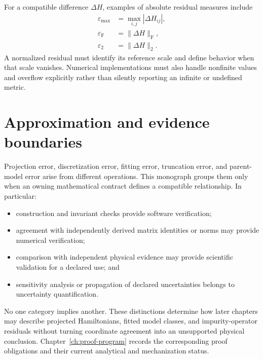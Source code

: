 For a compatible difference $\Delta H$, examples of absolute residual measures
include
\begin{align}
  \varepsilon_{\max} &= \max_{i,j}|\Delta H_{ij}|,\\
  \varepsilon_{\mathrm F} &= \|\Delta H\|_{\mathrm F},\\
  \varepsilon_{2} &= \|\Delta H\|_{2}.
\end{align}
A normalized residual must identify its reference scale and define behavior
when that scale vanishes. Numerical implementations must also handle nonfinite
values and overflow explicitly rather than silently reporting an infinite or
undefined metric.

\section{Approximation and evidence boundaries}

Projection error, discretization error, fitting error, truncation error, and
parent-model error arise from different operations. This monograph groups them
only when an owning mathematical contract defines a compatible relationship.
In particular:

\begin{itemize}
  \item construction and invariant checks provide software verification;
  \item agreement with independently derived matrix identities or norms may
    provide numerical verification;
  \item comparison with independent physical evidence may provide scientific
    validation for a declared use; and
  \item sensitivity analysis or propagation of declared uncertainties belongs
    to uncertainty quantification.
\end{itemize}

No one category implies another. These distinctions determine how later
chapters may describe projected Hamiltonians, fitted model classes, and
impurity-operator residuals without turning coordinate agreement into an
unsupported physical conclusion. Chapter~\ref{ch:proof-program} records the
corresponding proof obligations and their current analytical and mechanization
status.
